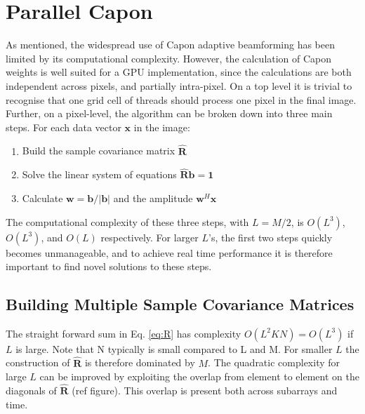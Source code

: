 \documentclass[journal]{IEEEtran}
\newcommand{\mat}[1]{\mathbf{#1}}
\renewcommand{\vec}[1]{\mathbf{#1}}
\begin{document}


\section{Parallel Capon}\label{sec:meth}
As mentioned, the widespread use of Capon adaptive beamforming has been limited by its computational complexity. However, the calculation of Capon weights is well suited for a GPU implementation, since the calculations are both independent across pixels, and partially intra-pixel. On a top level it is trivial to recognise that one grid cell of threads should process one pixel in the final image. Further, on a pixel-level, the algorithm can be broken down into three main steps. For each data vector $\vec{x}$ in the image:
\begin{enumerate}
\item Build the sample covariance matrix $\mat{\hat{R}}$
\item Solve the linear system of equations $\mat{\hat{R}}\vec{b} =\vec{ 1}$
\item Calculate $\vec{w} = \vec{b}/|\vec{b}|$ and the amplitude $\vec{w}^H\vec{x}$
\end{enumerate}
The computational complexity of these three steps, with $L = M/2$, is $O(L^3)$, $O(L^3)$, and $O(L)$ respectively. For larger $L$'s, the first two steps quickly becomes unmanageable, and to achieve real time performance it is therefore important to find novel solutions to these steps. 

\subsection{Building Multiple Sample Covariance Matrices}
The straight forward sum in Eq. \ref{eq:R} has complexity $O(L^2KN) = O(L^3)$ if $L$ is large. Note that N typically is small compared to L and M. For smaller $L$ the construction of $\mat{\hat{R}}$ is therefore dominated by $M$. The quadratic complexity for large $L$ can be improved by exploiting the overlap from element to element on the diagonals of $\mat{\hat{R}}$ (ref figure). This overlap is present both across subarrays and time.
\end{document}
